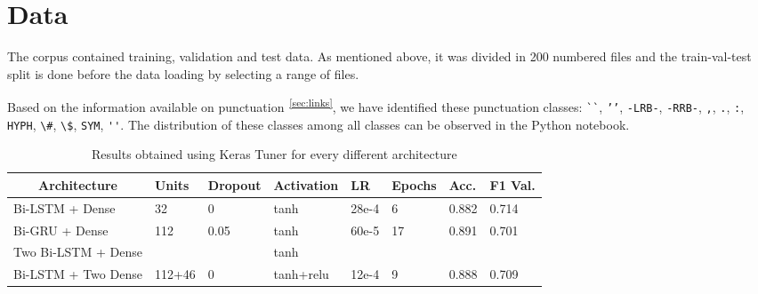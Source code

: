 \documentclass[11pt]{article}
\begin{document}

\section{Data}
\label{sec:data}


The corpus contained training, validation and test data.
As mentioned above, it was divided in 200 numbered files and the train-val-test split is done before the data loading by selecting a range of files.

Based on the information available on punctuation\textsuperscript{~\ref{sec:links}}, we have identified these punctuation classes: \verb|``|,  \verb|’’|,  \verb|-LRB-|,  \verb|-RRB-|, 
 \verb|,|,  \verb|.|,  \verb|:|,  \verb|HYPH|,  \verb|\#|,  \verb|\$|, 
 \verb|SYM|,  \verb|''|.
The distribution of these classes among all classes can be observed in the Python notebook.

\begin{table*}[!t]
\begin{tabular}{l|l|l|l|l|l|l|l}
\multicolumn{1}{c|}{\textbf{Architecture}} & \textbf{Units} & \textbf{Dropout} & \textbf{Activation} & \textbf{LR} & \textbf{Epochs} & \textbf{Acc.} & \multicolumn{1}{c}{\textbf{F1 Val.}} \\ \hline
Bi-LSTM + Dense		& 32		& 0		& tanh		& 28e-4	& 6		& 0.882	& 0.714	\\
Bi-GRU + Dense		& 112		& 0.05	& tanh		& 60e-5	& 17	& 0.891	& 0.701	\\
Two Bi-LSTM + Dense	&			&		& tanh		&		&		&		&		\\
Bi-LSTM + Two Dense	& 112+46	& 0		& tanh+relu	& 12e-4	& 9		& 0.888	& 0.709
\end{tabular}
\caption{Results obtained using Keras Tuner for every different architecture}
\label{table:tuner}
\end{table*}
\end{document}
